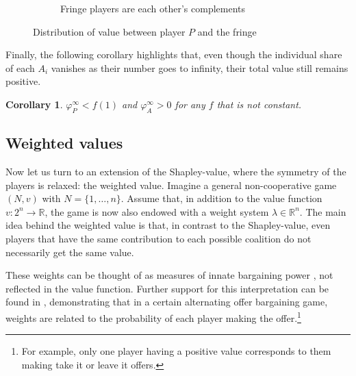 \documentclass[a4paper]{article}
\newtheorem{corollary}{Corollary}
\begin{document}
\begin{figure}
\begin{subfigure}[b]{0.45\textwidth}
        \caption{Fringe players are each other's complements}
    \end{subfigure}
    \caption{Distribution of value between player $P$ and the fringe}
    \label{fig:one_sided}
\end{figure}

Finally, the following corollary highlights that, even though the individual share of each $A_i$ vanishes as their number goes to infinity, their total value still remains positive.
\begin{corollary}
    \label{cor:fringe_value_2}
    $\varphi_P^\infty < f(1)$ and $\varphi_A^\infty > 0$ for any $f$ that is not constant.
\end{corollary}


\subsection{Weighted values}

Now let us turn to an extension of the Shapley-value, where the symmetry of the players is relaxed: the weighted value.
Imagine a general non-cooperative game $(N, v)$ with $N = \{1, \dots, n\}$.
Assume that, in addition to the value function $v : 2^n \to \mathbb{R}$, the game is now also endowed with a weight system $\lambda \in \mathbb{R}^n$.
The main idea behind the weighted value is that, in contrast to the Shapley-value, even players that have the same contribution to each possible coalition do not necessarily get the same value.

These weights can be thought of as measures of innate bargaining power \parencite{shapley1953additive}, not reflected in the value function.
Further support for this interpretation can be found in \textcite{hart1996bargaining}, demonstrating that in a certain alternating offer bargaining game, weights are related to the probability of each player making the offer.\footnote{
    For example, only one player having a positive value corresponds to them making take it or leave it offers.
}
\end{document}
